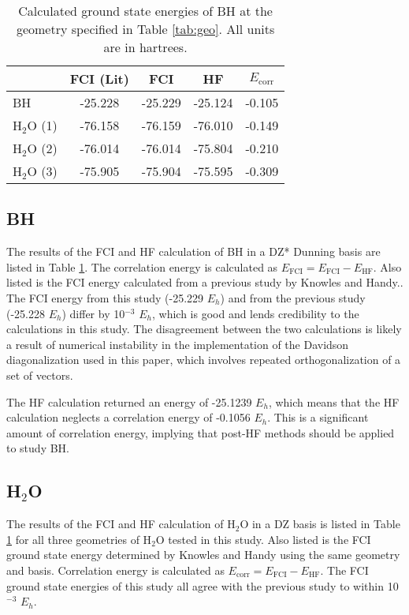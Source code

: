 \documentclass[final,3p,times,twocolumn]{elsarticle}
\begin{document}
\begin{table}
\centering
\begin{tabular}{l|c|ccc} \hline\hline
& FCI (Lit) \cite{handy-1983} & FCI & HF & $E_{\text{corr}}$ \\ \hline
BH & -25.228 & -25.229 &-25.124 & -0.105 \\ \hline
H$_2$O (1) & -76.158 & -76.159 & -76.010 & -0.149 \\ 
H$_2$O (2) & -76.014 & -76.014 & -75.804 & -0.210 \\
H$_2$O (3) & -75.905 & -75.904 & -75.595 & -0.309 \\\hline\hline
\end{tabular}
\caption{Calculated ground state energies of BH at the geometry specified in Table \ref{tab:geo}. All units are in hartrees.}
\label{tab:results}
\end{table}
\subsection{BH} \label{sec:bhresults}
The results of the FCI and HF calculation of BH in a DZ* Dunning basis are listed in Table \ref{tab:results}. The correlation energy is calculated as $E_{\text{FCI}} = E_{\text{FCI}} - E_{\text{HF}}$. Also listed is the FCI energy calculated from a previous study by Knowles and Handy.\cite{handy-1983}. The FCI energy from this study (-25.229 $E_h$) and from the previous study (-25.228 $E_h$) differ by 10$^{-3}$ $E_h$, which is good and lends credibility to the calculations in this study. The disagreement between the two calculations is likely a result of numerical instability in the implementation of the Davidson diagonalization used in this paper, which involves repeated orthogonalization of a set of vectors.


The HF calculation returned an energy of -25.1239 $E_h$, which means that the HF calculation neglects a correlation energy of -0.1056 $E_h$. This is a significant amount of correlation energy, implying that post-HF methods should be applied to study BH.


\subsection{H$_2$O} \label{sec:h2oresults}
The results of the FCI and HF calculation of H$_2$O in a DZ basis is listed in Table \ref{tab:results} for all three geometries of H$_2$O tested in this study. Also listed is the FCI ground state energy determined by Knowles and Handy using the same geometry and basis.\cite{handy-1983} Correlation energy is calculated as $E_{\text{corr}} = E_{\text{FCI}} - E_{\text{HF}}$. The FCI ground state energies of this study all agree with the previous study to within 10$^{-3}$ $E_h$. %
\end{document}
